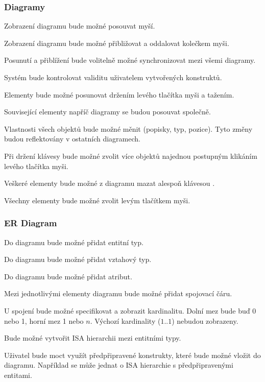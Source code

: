 \subsubsection*{Diagramy}
\begin{enumfp}[resume]
  \item Zobrazení diagramu bude možné posouvat myší.
  \item Zobrazení diagramu bude možné přibližovat a oddalovat kolečkem myši.
  \item Posunutí a přiblížení bude volitelně možné synchronizovat mezi všemi diagramy.
  \item Systém bude kontrolovat validitu uživatelem vytvořených konstruktů.
  \item Elementy bude možné posunovat držením levého tlačítka myši a tažením.
  \item Související elementy napříč diagramy se budou posouvat společně.
  \item Vlastnosti všech objektů bude možné měnit (popisky, typ, pozice).
  Tyto změny budou reflektovány v ostatních diagramech.
  \item Při držení klávesy \keys{\ctrl} bude možné zvolit více objektů najednou postupným klikáním levého tlačítka myši.
  \item Veškeré elementy bude možné z diagramu mazat alespoň klávesou .
  \item Všechny elementy bude možné zvolit levým tlačítkem myši.
\end{enumfp}

\subsubsection*{ER Diagram}
\begin{enumfp}[resume]
  \item Do diagramu bude možné přidat entitní typ.
  \item Do diagramu bude možné přidat vztahový typ.
  \item Do diagramu bude možné přidat atribut.
  \item Mezi jednotlivými elementy diagramu bude možné přidat spojovací čáru.
  \item U spojení bude možné specifikovat a zobrazit kardinalitu.
  Dolní mez bude buď 0 nebo 1, horní mez 1 nebo $n$.
  Výchozí kardinality ($1..1$) nebudou zobrazeny.
  \item Bude možné vytvořit ISA hierarchii mezi entitními typy.
  \item Uživatel bude moct využít předpřipravené konstrukty, které bude možné vložit do diagramu.
  Například se může jednat o ISA hierarchie s předpřipravenými entitami.
\end{enumfp}

